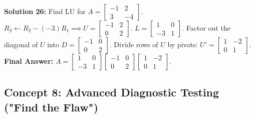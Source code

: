 \documentclass[11pt]{article}
\begin{document}
\vspace{0.5cm}
\textbf{Solution 26:}
Find LU for $A = \begin{bmatrix} -1 & 2 \\ 3 & -4 \end{bmatrix}$.
$R_2 \leftarrow R_2 - (-3)R_1 \implies U = \begin{bmatrix} -1 & 2 \\ 0 & 2 \end{bmatrix}$. $L = \begin{bmatrix} 1 & 0 \\ -3 & 1 \end{bmatrix}$.
Factor out the diagonal of $U$ into $D = \begin{bmatrix} -1 & 0 \\ 0 & 2 \end{bmatrix}$.
Divide rows of $U$ by pivots: $U' = \begin{bmatrix} 1 & -2 \\ 0 & 1 \end{bmatrix}$.
\textbf{Final Answer:} $A = \begin{bmatrix} 1 & 0 \\ -3 & 1 \end{bmatrix} \begin{bmatrix} -1 & 0 \\ 0 & 2 \end{bmatrix} \begin{bmatrix} 1 & -2 \\ 0 & 1 \end{bmatrix}$.

\subsection*{Concept 8: Advanced Diagnostic Testing ("Find the Flaw")}
\end{document}
